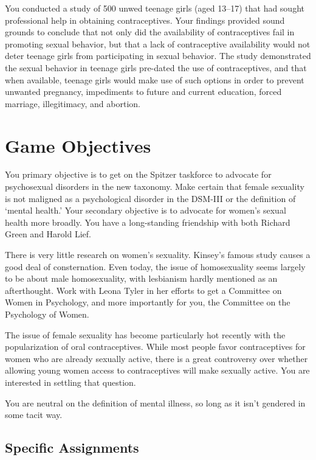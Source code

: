 You conducted a study of 500 unwed teenage girls (aged 13--17) that had sought professional help in obtaining contraceptives. Your findings provided sound grounds to conclude that not only did the availability of contraceptives fail in promoting sexual behavior, but that a lack of contraceptive availability would not deter teenage girls from participating in sexual behavior. The study demonstrated the sexual behavior in teenage girls pre-dated the use of contraceptives, and that when available, teenage girls would make use of such options in order to prevent unwanted pregnancy, impediments to future and current education, forced marriage, illegitimacy, and abortion.

\section{Game Objectives}
\label{gameobjectives}

You primary objective is to get on the Spitzer taskforce to advocate for psychosexual disorders in the new taxonomy. Make certain that female sexuality is not maligned as a psychological disorder in the DSM-III or the definition of `mental health.' Your secondary objective is to advocate for women's sexual health more broadly. You have a long-standing friendship with both Richard Green and Harold Lief.

There is very little research on women's sexuality. Kinsey's famous study causes a good deal of consternation. Even today, the issue of homosexuality seems largely to be about male homosexuality, with lesbianism hardly mentioned as an afterthought. Work with Leona Tyler in her efforts to get a Committee on Women in Psychology, and more importantly for you, the Committee on the Psychology of Women.

The issue of female sexuality has become particularly hot recently with the popularization of oral contraceptives. While most people favor contraceptives for women who are already sexually active, there is a great controversy over whether allowing young women access to contraceptives will make sexually active. You are interested in settling that question.

You are neutral on the definition of mental illness, so long as it isn't gendered in some tacit way.

\subsection{Specific Assignments}
\label{specificassignments}

